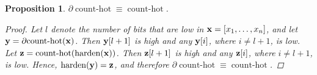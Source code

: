 \documentclass{article} %
\newtheorem{prop}{Proposition}
\begin{document}
\begin{prop}\label{prop:count}
	$\partial\!\operatorname{count-hot} \equiv \operatorname{count-hot}$.
	\begin{proof}
	Let $l$ denote the number of bits that are low in ${\bf x} = [x_{1},\dots,x_{n}]$, and let ${\bf y} = \partial\!\operatorname{count-hot}({\bf x})$. Then ${\bf y}[l+1]$ is high and any ${\bf y}[i]$, where $i \neq l+1$, is low. Let ${\bf z} = \operatorname{count-hot}(\operatorname{harden}({\bf x}))$. Then ${\bf z}[l+1]$ is high and any ${\bf z}[i]$, where $i \neq l+1$, is low. Hence, $\operatorname{harden}({\bf y}) = {\bf z}$, and therefore $\partial\!\operatorname{count-hot} \equiv \operatorname{count-hot}$.
	\end{proof}
\end{prop}
\end{document}
